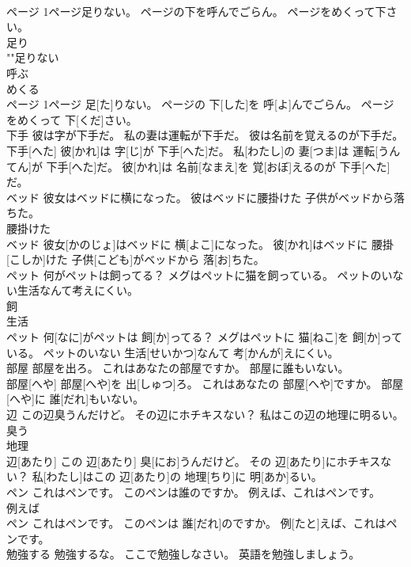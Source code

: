 \documentclass[8pt]{extreport}
\begin{document}
\begin{CJK}{UTF8}{min}
\\	ページ 1ページ足りない。 ページの下を呼んでごらん。 ページをめくって下さい。	
\\	足り 
\\	""足りない
\\	呼ぶ 
\\	めくる　
\\	ページ 1ページ 足[た]りない。 ページの 下[した]を 呼[よ]んでごらん。 ページをめくって 下[くだ]さい。
\\	下手 彼は字が下手だ。 私の妻は運転が下手だ。 彼は名前を覚えるのが下手だ。	
\\	下手[へた] 彼[かれ]は 字[じ]が 下手[へた]だ。 私[わたし]の 妻[つま]は 運転[うんてん]が 下手[へた]だ。 彼[かれ]は 名前[なまえ]を 覚[おぼ]えるのが 下手[へた]だ。
\\	ベッド 彼女はベッドに横になった。 彼はベッドに腰掛けた 子供がベッドから落ちた。	
\\	腰掛けた 
\\	ベッド 彼女[かのじょ]はベッドに 横[よこ]になった。 彼[かれ]はベッドに 腰掛[こしか]けた 子供[こども]がベッドから 落[お]ちた。
\\	ペット 何がペットは飼ってる？ メグはペットに猫を飼っている。 ペットのいない生活なんて考えにくい。	
\\	飼 
\\	生活 
\\	ペット 何[なに]がペットは 飼[か]ってる？ メグはペットに 猫[ねこ]を 飼[か]っている。 ペットのいない 生活[せいかつ]なんて 考[かんが]えにくい。
\\	部屋 部屋を出ろ。 これはあなたの部屋ですか。 部屋に誰もいない。	
\\	部屋[へや] 部屋[へや]を 出[しゅつ]ろ。 これはあなたの 部屋[へや]ですか。 部屋[へや]に 誰[だれ]もいない。
\\	辺 この辺臭うんだけど。 その辺にホチキスない？ 私はこの辺の地理に明るい。	
\\	臭う 
\\	地理 
\\	辺[あたり] この 辺[あたり] 臭[にお]うんだけど。 その 辺[あたり]にホチキスない？ 私[わたし]はこの 辺[あたり]の 地理[ちり]に 明[あか]るい。
\\	ペン これはペンです。 このペンは誰のですか。 例えば、これはペンです。	
\\	例えば 
\\	ペン これはペンです。 このペンは 誰[だれ]のですか。 例[たと]えば、これはペンです。
\\	勉強する 勉強するな。 ここで勉強しなさい。 英語を勉強しましょう。	

\end{CJK}
\end{document}
